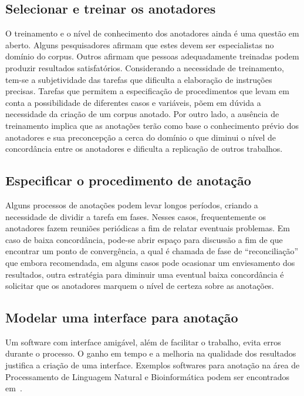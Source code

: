 

\subsection*{Selecionar e treinar os anotadores}

O treinamento e o nível de conhecimento dos anotadores ainda é uma questão em aberto. Alguns pesquisadores afirmam que estes devem ser especialistas no domínio do corpus. Outros afirmam que pessoas adequadamente treinadas podem produzir resultados satisfatórios. 
Considerando a necessidade de treinamento, tem-se a subjetividade das tarefas que dificulta a elaboração de instruções precisas. Tarefas que permitem a especificação de procedimentos que levam em conta a possibilidade de diferentes casos e variáveis, põem em dúvida a necessidade da criação de um corpus anotado.
Por outro lado, a ausência de treinamento implica que as anotações terão como base o conhecimento prévio dos anotadores e sua preconcepção a cerca do domínio o que diminui o nível de concordância entre os anotadores e dificulta a replicação de outros trabalhos.


\subsection*{Especificar o procedimento de anotação}
Alguns processos de anotações podem levar longos períodos, criando a necessidade de dividir a tarefa em fases. Nesses casos, frequentemente os anotadores fazem reuniões periódicas a fim de relatar eventuais problemas.  
Em caso de baixa concordância, pode-se abrir espaço para discussão a fim de que encontrar um ponto de convergência, a qual é chamada de fase de ``reconciliação'' que embora recomendada, em alguns casos pode ocasionar um enviesamento dos resultados, outra estratégia para diminuir uma eventual baixa concordância é solicitar que os anotadores marquem o nível de certeza sobre as anotações.

\subsection*{Modelar uma interface para anotação}
Um software com interface amigável, além de facilitar o trabalho, evita erros durante o processo. 
O ganho em tempo e a melhoria na qualidade dos resultados justifica a criação de uma interface. 
Exemplos softwares para anotação na área de Processamento de Linguagem Natural e Bioinformática podem ser encontrados em~\cite{Gruenstein2007}.



